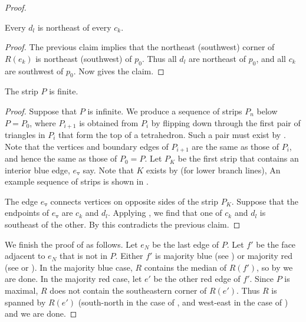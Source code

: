 \documentclass[12pt]{amsart}
\begin{document}
\begin{proof}
\begin{claim*}
Every $d_l$ is northeast of every $c_k$. 
\end{claim*}

\begin{proof}
The previous claim implies that the northeast (southwest) corner of $R(e_k)$ is northeast (southwest) of $p_0$. Thus all $d_l$ are northeast of $p_0$, and all $c_k$ are southwest of $p_0$.  Now  gives the claim.
\end{proof}

\begin{claim*}
The strip $P$ is finite.
\end{claim*}

\begin{proof}
Suppose that $P$ is infinite.  We produce a sequence of strips $P_n$ below $P = P_0$, where $P_{i+1}$ is obtained from $P_i$ by flipping down through the first pair of triangles in $P_i$ that form the top of a tetrahedron.  Such a pair must exist by .  Note that the vertices and boundary edges of $P_{i+1}$ are the same as those of $P_i$, and hence the same as those of $P_0 = P$.  Let $P_K$ be the first strip that contains an interior blue edge, $e_\triangledown$ say. Note that $K$ exists by  (for lower branch lines), An example sequence of strips is shown in . 

The edge $e_\triangledown$ connects vertices on opposite sides of the strip $P_K$.  Suppose that the endpoints of $e_\triangledown$ are $c_k$ and $d_l$.  Applying , we find that one of $c_k$ and $d_l$ is southeast of the other.  By  this contradicts the previous claim.
\end{proof}

We finish the proof of  as follows. Let $e_N$ be the last edge of $P$.
Let $f'$ be the face adjacent to $e_N$ that is not in $P$.  
Either $f'$ is majority blue (see ) or majority red (see  or ).  In the majority blue case, $R$ contains the median of $R(f')$, so by  we are done.  In the majority red case, let $e'$ be the other red edge of $f'$.  Since $P$ is maximal, $R$ does not contain the southeastern corner of $R(e')$.  Thus $R$ is spanned by $R(e')$ (south-north in the case of , and west-east in the case of ) and we are done.  
\end{proof}
\end{document}

